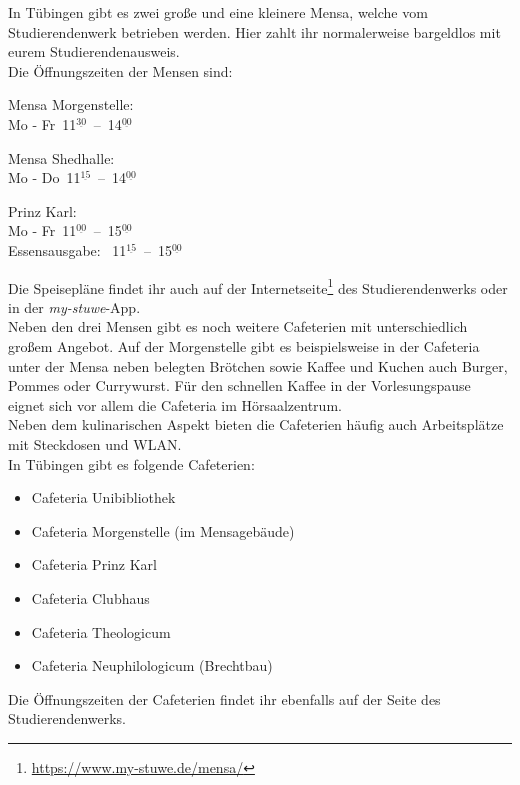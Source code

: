 
In Tübingen gibt es zwei große und eine kleinere Mensa, welche vom
Studierendenwerk betrieben werden. Hier zahlt ihr normalerweise bargeldlos mit
eurem Studierendenausweis.\\ Die Öffnungszeiten der Mensen sind:
\begin{center}

Mensa Morgenstelle:\\
Mo - Fr~11$^{\underline{30}}$~--~14$^{\underline{00}}$

\bigskip

Mensa Shedhalle:\\
Mo - Do~11$^{\underline{15}}$~--~14$^{\underline{00}}$

\bigskip

\nopagebreak
Prinz Karl:\\
Mo - Fr~11$^{\underline{00}}$~--~15$^{\underline{00}}$\\
Essensausgabe: ~11$^{\underline{15}}$~--~15$^{\underline{00}}$

\end{center}

Die Speisepläne findet ihr auch auf der
Internetseite\footnote{\url{https://www.my-stuwe.de/mensa/}} des
Studierendenwerks oder in der \emph{my-stuwe}-App.\\

Neben den drei Mensen gibt es noch weitere Cafeterien mit unterschiedlich
großem Angebot. Auf der Morgenstelle gibt es beispielsweise in der Cafeteria
unter der Mensa neben belegten Brötchen sowie Kaffee und Kuchen auch Burger,
Pommes oder Currywurst. Für den schnellen Kaffee in der Vorlesungspause eignet
sich vor allem die Cafeteria im Hörsaalzentrum.\\ Neben dem kulinarischen
Aspekt bieten die Cafeterien häufig auch Arbeitsplätze mit Steckdosen und
WLAN.\\
In Tübingen gibt es folgende Cafeterien:
\begin{itemize}
	\setlength\itemsep{0.3em}
	\item Cafeteria Unibibliothek
	\item Cafeteria Morgenstelle (im Mensagebäude)
	\item Cafeteria Prinz Karl
	\item Cafeteria Clubhaus
	\item Cafeteria Theologicum
	\item Cafeteria Neuphilologicum (Brechtbau)
\end{itemize} Die Öffnungszeiten der Cafeterien findet ihr ebenfalls auf der
Seite des Studierendenwerks.

